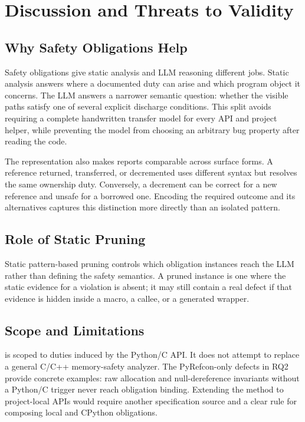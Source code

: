 \section{Discussion and Threats to Validity}
\label{sec:discussion}

\subsection{Why Safety Obligations Help}

Safety obligations give static analysis and LLM reasoning different jobs.
Static analysis answers where a documented duty can arise and which program
object it concerns. The LLM answers a narrower semantic question: whether the
visible paths satisfy one of several explicit discharge conditions. This split
avoids requiring a complete handwritten transfer model for every API and
project helper, while preventing the model from choosing an arbitrary bug
property after reading the code.

The representation also makes reports comparable across surface forms. A
reference returned, transferred, or decremented uses different syntax but
resolves the same ownership duty. Conversely, a decrement can be correct for a
new reference and unsafe for a borrowed one. Encoding the required outcome and
its alternatives captures this distinction more directly than an isolated
pattern.

\subsection{Role of Static Pruning}

Static pattern-based pruning controls which obligation instances reach the LLM
rather than defining the safety semantics. A pruned instance is one where the
static evidence for a violation is absent; it may still contain a real defect
if that evidence is hidden inside a macro, a callee, or a generated wrapper.

\subsection{Scope and Limitations}

\tool is scoped to duties induced by the Python/C API. It does not attempt to
replace a general C/C++ memory-safety analyzer. The PyRefcon-only defects in
RQ2 provide concrete examples: raw allocation and null-dereference invariants
without a Python/C trigger never reach obligation binding. Extending the
method to project-local APIs would require another specification source and a
clear rule for composing local and CPython obligations.

